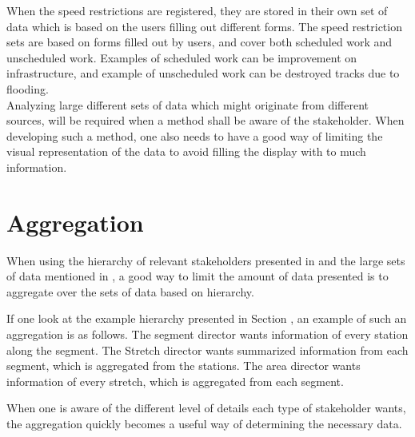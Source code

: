When the speed restrictions are registered, they are stored in their own set of
data which is based on the users filling out different forms. The speed
restriction sets are based on forms filled out by users, and cover both
scheduled work and unscheduled work. Examples of scheduled work can be
improvement on infrastructure, and example of unscheduled work can be destroyed
tracks due to flooding. \\

Analyzing large different sets of data which might originate from different
sources, will be required when a method shall be aware of the stakeholder.
When developing such a method, one also needs to have a good way of limiting
the visual representation of the data to avoid filling the display with to much
information.

\section{Aggregation} %
\label{sec:back_aggregation}

When using the hierarchy of relevant stakeholders presented in 
and the large sets of data mentioned in , a
good way to limit the amount of data presented is to aggregate over the sets of
data based on hierarchy.

If one look at the example hierarchy presented in Section
, an example of such an aggregation is as
follows. The segment director wants information of every station along the
segment. The Stretch director wants summarized information from each segment, which is
aggregated from the stations. The area director wants information of every
stretch, which is aggregated from each segment.

When one is aware of the different level of details each type of stakeholder
wants, the aggregation quickly becomes a useful way of determining the
necessary data.

